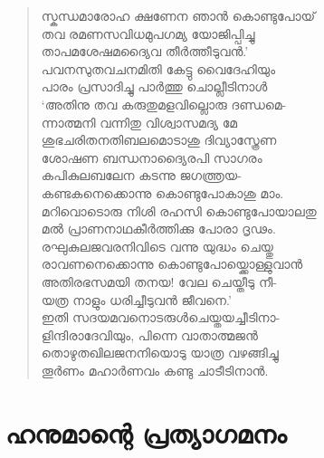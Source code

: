 \begin{verse}
സ്കന്ധമാരോഹ ക്ഷണേന ഞാന്‍ കൊണ്ടുപോയ്\\
തവ രമണസവിധമുപഗമ്യ യോജിപ്പിച്ചു\\
താപമശേഷമദ്യൈവ തീര്‍ത്തീടുവന്‍.’\\
പവനസുതവചനമിതി കേട്ടു വൈദേഹിയും\\
പാരം പ്രസാദിച്ചു പാര്‍ത്തു ചൊല്ലീടിനാള്‍\\
‘അതിനു തവ കരുതുമളവില്ലൊരു ദണ്ഡമെ-\\
ന്നാത്മനി വന്നിതു വിശ്വാസമദ്യ മേ\\
ശുഭചരിതനതിബലമൊടാശു ദിവ്യാസ്ത്രേണ\\
ശോഷണ ബന്ധനാദ്യൈരപി സാഗരം\\
കപികുലബലേന കടന്നു ജഗത്ത്രയ-\\
കണ്ടകനെക്കൊന്നു കൊണ്ടുപോകാശു മാം.\\
മറിവൊടൊരു നിശി രഹസി കൊണ്ടുപോയാലതു\\
മല്‍ പ്രാണനാഥകീര്‍ത്തിക്കു പോരാ ദൃഢം.\\
രഘുകുലജവരനിവിടെ വന്നു യുദ്ധം ചെയ്തു\\
രാവണനെക്കൊന്നു കൊണ്ടുപോയ്ക്കൊള്ളുവാന്‍\\
അതിരഭസമയി തനയ! വേല ചെയ്തീടു നീ-\\
യത്ര നാളും ധരിച്ചീടുവന്‍ ജീവനെ.’\\
ഇതി സദയമവനൊടരുള്‍ചെയ്തയച്ചീടിനാ-\\
ളിന്ദിരാദേവിയും, പിന്നെ വാതാത്മജന്‍\\
തൊഴുതഖിലജനനിയൊടു യാത്ര വഴങ്ങിച്ചു\\
തൂര്‍ണം മഹാര്‍ണവം കണ്ടു ചാടീടിനാന്‍.
\end{verse}


\section{ഹനുമാന്റെ പ്രത്യാഗമനം}

